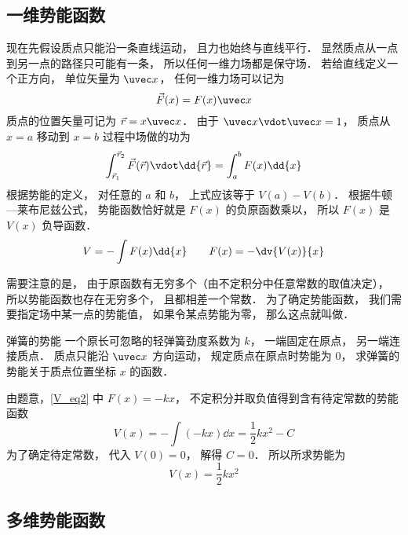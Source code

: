 \subsection{一维势能函数}

现在先假设质点只能沿一条直线运动， 且力也始终与直线平行． 显然质点从一点到另一点的路径只可能有一条， 所以任何一维力场都是保守场． 若给直线定义一个正方向， 单位矢量为 $\uvec x$， 任何一维力场可以记为
\begin{equation}\label{V_eq2}
\vec F(x) = F(x) \uvec x
\end{equation}
质点的位置矢量可记为 $\vec r = x \uvec x$． 由于 $\uvec x \vdot \uvec x = 1$， 质点从 $x = a$ 移动到 $x=b$ 过程中场做的功为
\begin{equation}
\int_{\vec r_1}^{\vec r_2} \vec F(\vec r) \vdot \dd{\vec r}
= \int_a^b F(x) \dd{x}
\end{equation}
根据势能的定义， 对任意的 $a$ 和 $b$， 上式应该等于 $V(a) - V(b)$． 根据牛顿—莱布尼兹公式， 势能函数恰好就是 $F(x)$ 的负原函数乘以， 所以 $F(x)$ 是 $V(x)$ 负导函数．
\begin{equation}\label{V_eq8}
V = -\int F(x) \dd{x}
\qquad
F(x) = -\dv{V(x)}{x}
\end{equation}

需要注意的是， 由于原函数有无穷多个（由不定积分中任意常数的取值决定）， 所以势能函数也存在无穷多个， 且都相差一个常数． 为了确定势能函数， 我们需要指定场中某一点的势能值， 如果令某点势能为零， 那么这点就叫做．

\begin{exam}{弹簧的势能}
一个原长可忽略的轻弹簧劲度系数为 $k$， 一端固定在原点， 另一端连接质点． 质点只能沿 $\uvec x$ 方向运动， 规定质点在原点时势能为 $0$， 求弹簧的势能关于质点位置坐标 $x$ 的函数． 

由题意，\autoref{V_eq2} 中 $F(x) = -kx$， 不定积分并取负值得到含有待定常数的势能函数
\begin{equation}
V(x) = -\int (-kx) \dd{x} = \frac12 k x^2 - C
\end{equation}
为了确定待定常数， 代入 $V(0) = 0$， 解得 $C = 0$． 所以所求势能为
\begin{equation}
V(x) =  \frac12 k x^2
\end{equation}
\end{exam}


\subsection{多维势能函数}

